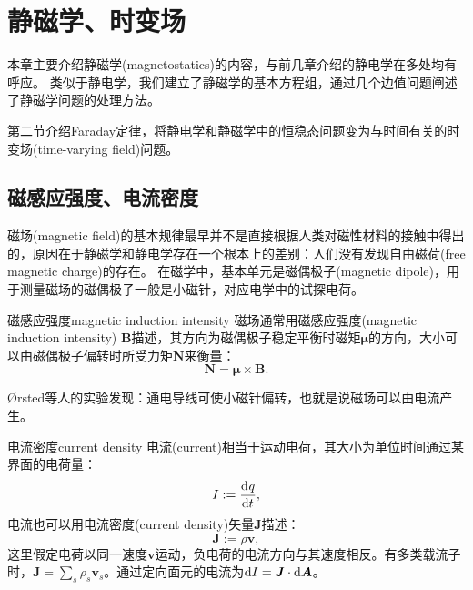 
\chapter{静磁学、时变场}

\label{chap:magnetostatics}

本章主要介绍静磁学(magnetostatics)的内容，与前几章介绍的静电学在多处均有呼应。%
类似于静电学，我们建立了静磁学的基本方程组，通过几个边值问题阐述了静磁学问题的处理方法。%

第二节介绍Faraday定律，将静电学和静磁学中的恒稳态问题变为与时间有关的时变场(time-varying field)问题。

\section{磁感应强度、电流密度}
\label{sec:introduction to magnetostatics}

磁场(magnetic field)的基本规律最早并不是直接根据人类对磁性材料的接触中得出的，原因在于静磁学和静电学存在一个根本上的差别：人们没有发现自由磁荷(free magnetic charge)的存在。
在磁学中，基本单元是磁偶极子(magnetic dipole)，用于测量磁场的磁偶极子一般是小磁针，对应电学中的试探电荷。
\begin{definition}
    {磁感应强度}{magnetic induction intensity}
    磁场通常用磁感应强度(magnetic induction intensity) $\bm B$描述，其方向为磁偶极子稳定平衡时磁矩$\bm\mu$的方向，大小可以由磁偶极子偏转时所受力矩$\bm N$来衡量：
    \begin{equation}
        \bm N = \bm\mu \times \bm B.
    \end{equation}
\end{definition}
Ørsted等人的实验发现：通电导线可使小磁针偏转，也就是说磁场可以由电流产生。
\begin{definition}
    {电流密度}{current density}
    电流(current)相当于运动电荷，其大小为单位时间通过某界面的电荷量：
    \begin{equation}
        I := \frac{\mathop{}\!\mathrm{d}^{}q}{\mathrm{d}{t}^{}},
    \end{equation}
    电流也可以用电流密度(current density)矢量$\bm J$描述：
    \begin{equation}
        \bm J := \rho\bm v,
    \end{equation}
    这里假定电荷以同一速度$\bm v$运动，负电荷的电流方向与其速度相反。有多类载流子时，$\textstyle \bm J = \sum_s\rho_s\bm v_s$。通过定向面元的电流为$\mathop{}\!\mathrm{d} I = \bm J \cdot \mathop{}\!\mathrm{d}\bm A$。
\end{definition}

